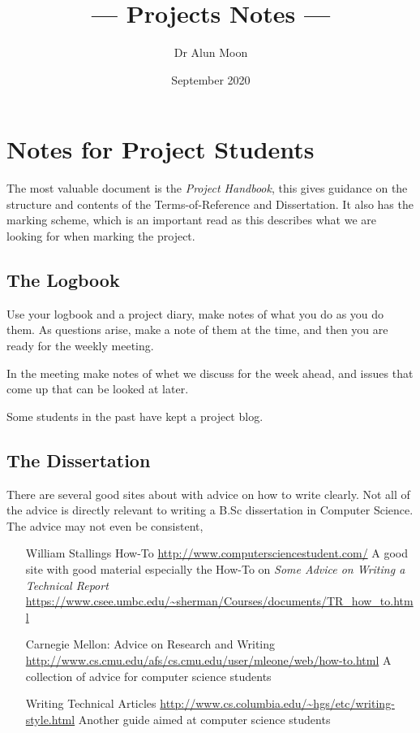\documentclass{tufte-handout}
\title{--- Projects Notes ---}
\author{Dr Alun Moon}
\date{September 2020}
\begin{document}
\maketitle

\section{Notes for Project Students}

The most valuable document is the \emph{Project Handbook}, this gives guidance
on the structure and contents of the Terms-of-Reference and Dissertation.  It
also has the marking scheme, which is an important read as this describes what
we are looking for when marking the project.

\subsection{The Logbook}
Use your logbook and a project diary, make notes of what you do as you do
them.  As questions arise, make a note of them at the time, and then you are
ready for the weekly meeting.

In the meeting make notes of whet we discuss for the week ahead, and issues
that come up that can be looked at later.

Some students in the past have kept a project blog.

\subsection{The Dissertation} 
There are several good sites about with advice on how to write clearly.  Not
all of the advice is directly relevant to writing a B.Sc dissertation in
Computer Science.  The advice may not even be consistent, 

\begin{itemize}
	\item[William Stallings How-To]
		\url{http://www.computersciencestudent.com/}
		A good site with good material especially the How-To on \emph{Some
		Advice on Writing a Technical Report}
		\url{https://www.csee.umbc.edu/~sherman/Courses/documents/TR_how_to.html}

	\item[Carnegie Mellon: Advice on Research and Writing]
		\url{http://www.cs.cmu.edu/afs/cs.cmu.edu/user/mleone/web/how-to.html}
		A collection of advice for computer science students

	\item[Writing Technical Articles]
		\url{http://www.cs.columbia.edu/~hgs/etc/writing-style.html}
		Another guide aimed at computer science students

\end{itemize}
\end{document}
